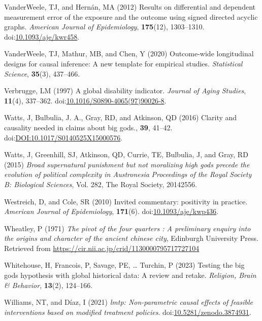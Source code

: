 \documentclass[
  single column]{article}
\newlength{\cslhangindent}
\newenvironment{CSLReferences}[2] %
 {\begin{list}{}{%
  \setlength{\itemindent}{0pt}
  \setlength{\leftmargin}{0pt}
  \setlength{\parsep}{0pt}
  \ifodd #1
   \setlength{\leftmargin}{\cslhangindent}
   \setlength{\itemindent}{-1\cslhangindent}
  \fi
  \setlength{\itemsep}{#2\baselineskip}}}
 {\end{list}}
\begin{document}
\begin{CSLReferences}{1}{0}
VanderWeele, TJ, and Hernán, MA (2012) Results on differential and
dependent measurement error of the exposure and the outcome using signed
directed acyclic graphs. \emph{American Journal of Epidemiology},
\textbf{175}(12), 1303--1310.
doi:\href{https://doi.org/10.1093/aje/kwr458}{10.1093/aje/kwr458}.

VanderWeele, TJ, Mathur, MB, and Chen, Y (2020) Outcome-wide
longitudinal designs for causal inference: A new template for empirical
studies. \emph{Statistical Science}, \textbf{35}(3), 437--466.

Verbrugge, LM (1997) A global disability indicator. \emph{Journal of
Aging Studies}, \textbf{11}(4), 337--362.
doi:\href{https://doi.org/10.1016/S0890-4065(97)90026-8}{10.1016/S0890-4065(97)90026-8}.

Watts, J, Bulbulia, J. A., Gray, RD, and Atkinson, QD (2016) Clarity and
causality needed in claims about big gods., \textbf{39}, 41--42.
doi:\href{https://doi.org/DOI:10.1017/S0140525X15000576}{DOI:10.1017/S0140525X15000576}.

Watts, J, Greenhill, SJ, Atkinson, QD, Currie, TE, Bulbulia, J, and
Gray, RD (2015) \emph{Broad supernatural punishment but not moralizing
high gods precede the evolution of political complexity in
{A}ustronesia} \emph{Proceedings of the Royal Society B: Biological
Sciences}, Vol. 282, The Royal Society, 20142556.

Westreich, D, and Cole, SR (2010) Invited commentary: positivity in
practice. \emph{American Journal of Epidemiology}, \textbf{171}(6).
doi:\href{https://doi.org/10.1093/aje/kwp436}{10.1093/aje/kwp436}.

Wheatley, P (1971) \emph{The pivot of the four quarters : A preliminary
enquiry into the origins and character of the ancient chinese city},
Edinburgh University Press. Retrieved from
\url{https://cir.nii.ac.jp/crid/1130000795717727104}

Whitehouse, H, Francois, P, Savage, PE, \ldots{} Turchin, P (2023)
Testing the big gods hypothesis with global historical data: A review
and retake. \emph{Religion, Brain \& Behavior}, \textbf{13}(2),
124--166.

Williams, NT, and Díaz, I (2021) \emph{{l}mtp: Non-parametric causal
effects of feasible interventions based on modified treatment policies}.
doi:\href{https://doi.org/10.5281/zenodo.3874931}{10.5281/zenodo.3874931}.


\end{CSLReferences}
\end{document}
